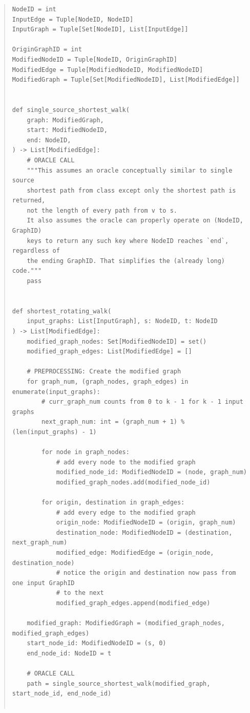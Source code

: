 \documentclass[11pt]{article}
\begin{document}
\begin{enumerate}
\begin{enumerate}
\begin{quote}
\begin{verbatim}
NodeID = int
InputEdge = Tuple[NodeID, NodeID]
InputGraph = Tuple[Set[NodeID], List[InputEdge]]

OriginGraphID = int
ModifiedNodeID = Tuple[NodeID, OriginGraphID]
ModifiedEdge = Tuple[ModifiedNodeID, ModifiedNodeID]
ModifiedGraph = Tuple[Set[ModifiedNodeID], List[ModifiedEdge]]


def single_source_shortest_walk(
    graph: ModifiedGraph,
    start: ModifiedNodeID,
    end: NodeID,
) -> List[ModifiedEdge]:
    # ORACLE CALL
    """This assumes an oracle conceptually similar to single source
    shortest path from class except only the shortest path is returned,
    not the length of every path from v to s.
    It also assumes the oracle can properly operate on (NodeID, GraphID)
    keys to return any such key where NodeID reaches `end`, regardless of
    the ending GraphID. That simplifies the (already long) code."""
    pass


def shortest_rotating_walk(
    input_graphs: List[InputGraph], s: NodeID, t: NodeID
) -> List[ModifiedEdge]:
    modified_graph_nodes: Set[ModifiedNodeID] = set()
    modified_graph_edges: List[ModifiedEdge] = []

    # PREPROCESSING: Create the modified graph
    for graph_num, (graph_nodes, graph_edges) in enumerate(input_graphs):
        # curr_graph_num counts from 0 to k - 1 for k - 1 input graphs
        next_graph_num: int = (graph_num + 1) % (len(input_graphs) - 1)

        for node in graph_nodes:
            # add every node to the modified graph
            modified_node_id: ModifiedNodeID = (node, graph_num)
            modified_graph_nodes.add(modified_node_id)

        for origin, destination in graph_edges:
            # add every edge to the modified graph
            origin_node: ModifiedNodeID = (origin, graph_num)
            destination_node: ModifiedNodeID = (destination, next_graph_num)
            modified_edge: ModifiedEdge = (origin_node, destination_node)
            # notice the origin and destination now pass from one input GraphID
            # to the next
            modified_graph_edges.append(modified_edge)

    modified_graph: ModifiedGraph = (modified_graph_nodes, modified_graph_edges)
    start_node_id: ModifiedNodeID = (s, 0)
    end_node_id: NodeID = t

    # ORACLE CALL
    path = single_source_shortest_walk(modified_graph, start_node_id, end_node_id)


\end{verbatim}
\end{quote}
\end{enumerate}
\end{enumerate}
\end{document}
